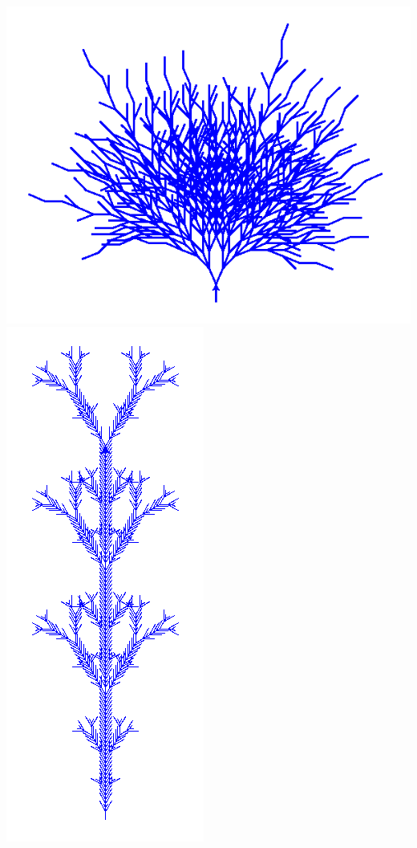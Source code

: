 \documentclass[11pt,class=report,crop=false]{standalone}
\begin{document}
\begin{center}
\includegraphics[scale=\myscale,scale=0.3]{figures/plante-04}\qquad
\includegraphics[scale=\myscale,scale=0.3]{figures/plante-05}\qquad

\end{center}
\end{document}
